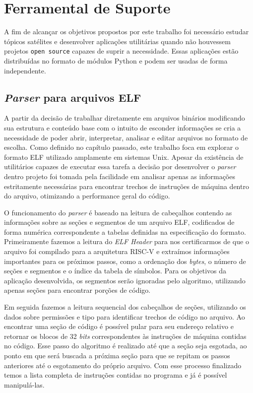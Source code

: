 \section{Ferramental de Suporte}

A fim de alcançar os objetivos propostos por este trabalho foi necessário estudar tópicos satélites e desenvolver aplicações utilitárias quando não houvessem projetos \texttt{open source} capazes de suprir a necessidade. Essas aplicações estão distribuídas no formato de módulos Python e podem ser usadas de forma independente.

\subsection{\textit{Parser} para arquivos ELF}

A partir da decisão de trabalhar diretamente em arquivos binários modificando sua estrutura e conteúdo base com o intuito de esconder informações se cria a necessidade de poder abrir, interpretar, analisar e editar arquivos no formato de escolha. Como definido no capítulo passado, este trabalho foca em explorar o formato ELF utilizado amplamente em sistemas Unix. Apesar da existência de utilitários capazes de executar essa tarefa a decisão por desenvolver o \textit{parser} dentro projeto foi tomada pela facilidade em analisar apenas as informações estritamente necessárias para encontrar trechos de instruções de máquina dentro do arquivo, otimizando a performance geral do código.

O funcionamento do \textit{parser} é baseado na leitura de cabeçalhos contendo as informações sobre as seções e segmentos de um arquivo ELF, codificados de forma numérica correspondente a tabelas definidas na especificação do formato. Primeiramente fazemos a leitura do \textit{ELF Header} para nos certificarmos de que o arquivo foi compilado para a arquitetura RISC-V e extraímos informações importantes para os próximos passos, como a ordenação dos \textit{bytes}, o número de seções e segmentos e o índice da tabela de símbolos. Para os objetivos da aplicação desenvolvida, os segmentos serão ignoradas pelo algoritmo, utilizando apenas seções para encontrar porções de código.

Em seguida fazemos a leitura sequencial dos cabeçalhos de seções, utilizando os dados sobre permissões e tipo para identificar trechos de código no arquivo. Ao encontrar uma seção de código é possível pular para seu endereço relativo e retornar os blocos de 32 \textit{bits} correspondentes às instruções de máquina contidas no código. Esse passo do algoritmo é realizado até que a seção seja esgotada, ao ponto em que será buscada a próxima seção para que se repitam os passos anteriores até o esgotamento do próprio arquivo. Com esse processo finalizado temos a lista completa de instruções contidas no programa e já é possível manipulá-las.

